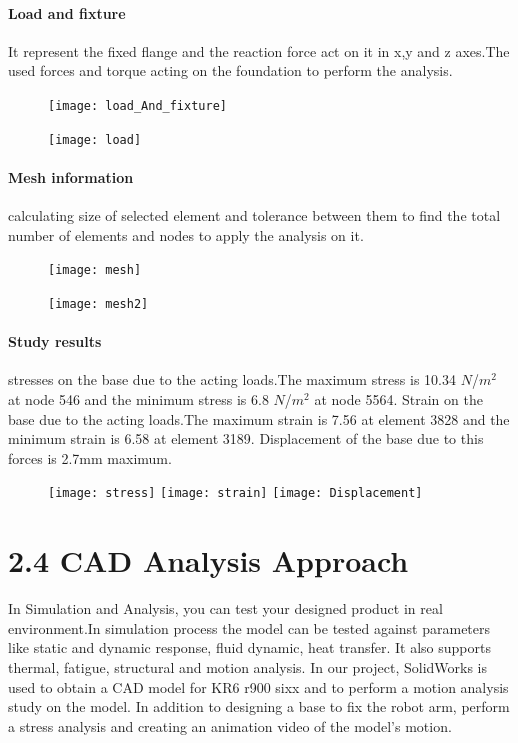 \paragraph{Load and fixture}
It represent the fixed flange and the reaction force act on it in x,y and z axes.The used forces and torque acting on the foundation to perform the analysis.
\begin{figure}[H]
	
	\centering
	\texttt{[image: load\_And\_fixture]}
\end{figure}

\begin{figure}[H]
	\centering
	\texttt{[image: load]}
\end{figure}

\paragraph{Mesh information}
calculating size of selected element and tolerance between them to find the total number of elements and nodes to apply the analysis on it.

\begin{figure}[H]
	\centering
	\texttt{[image: mesh]}
\end{figure}

\begin{figure}[H]
\centering
	\texttt{[image: mesh2]}
\end{figure}

\paragraph{Study results}
stresses on the base due to the acting loads.The maximum stress is 10.34 $N$/$m^{2}$ at node 546 and the minimum stress is 6.8 $N$/$m^{2}$ at node 5564. Strain on the base due to the acting loads.The maximum strain is 7.56 at element 3828 and the minimum strain is 6.58 at element 3189. Displacement of the base due to this forces is 2.7mm maximum.

\begin{figure}[H]
	\centering
	\texttt{[image: stress]}
	\texttt{[image: strain]}
	\texttt{[image: Displacement]}
\end{figure}

\newpage
\section{2.4 CAD Analysis Approach}

In Simulation and Analysis, you can test your designed product in real environment.In simulation process the model can be tested against parameters like static and dynamic response, fluid dynamic, heat transfer. It also supports thermal, fatigue, structural and motion analysis. 
\newline In our project, SolidWorks is used to obtain a CAD model for KR6 r900 sixx and to perform a motion analysis study on the model. In addition to designing a base to fix the robot arm, perform a stress analysis and creating an animation video of the model’s motion.

